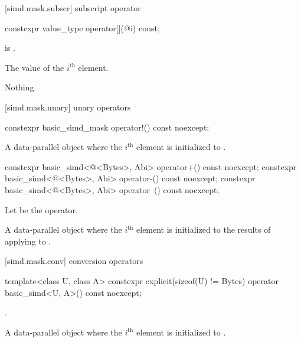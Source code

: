 [simd.mask.subscr]{ subscript operator}

\begin{itemdecl}
constexpr value_type operator[](@\simdsizetype@ i) const;
\end{itemdecl}

\begin{itemdescr}
  \pnum\expects
   is .

  \pnum\returns
  The value of the $i^\text{th}$ element.

  \pnum\throws Nothing.
\end{itemdescr}

[simd.mask.unary]{ unary operators}

\begin{itemdecl}
constexpr basic_simd_mask operator!() const noexcept;
\end{itemdecl}

\begin{itemdescr}
  \pnum\returns
  A data-parallel object where the $i^\text{th}$ element is initialized to 
  \foralli.
\end{itemdescr}

\begin{itemdecl}
constexpr basic_simd<@\integerfrom@<Bytes>, Abi> operator+() const noexcept;
constexpr basic_simd<@\integerfrom@<Bytes>, Abi> operator-() const noexcept;
constexpr basic_simd<@\integerfrom@<Bytes>, Abi> operator~() const noexcept;
\end{itemdecl}

\begin{itemdescr}
  \pnum Let \op{} be the operator.

  \pnum\returns
  A data-parallel object where the $i^\text{th}$ element is initialized to the results of applying
  \op{} to  \foralli.
\end{itemdescr}

[simd.mask.conv]{ conversion operators}

\begin{itemdecl}
template<class U, class A>
  constexpr explicit(sizeof(U) != Bytes) operator basic_simd<U, A>() const noexcept;
\end{itemdecl}

\begin{itemdescr}
  \pnum\constraints
  .

  \pnum\returns
  A data-parallel object where the $i^\text{th}$ element is initialized to
  .
\end{itemdescr}

